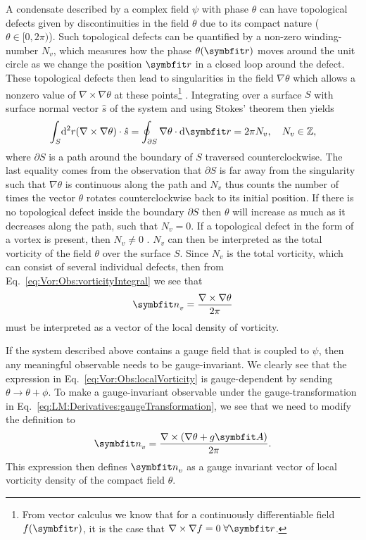 A condensate described by a complex field $\psi$ with phase $\theta$ can have topological defects given by discontinuities in the field $\theta$ due to its compact
nature ($\theta\in[0,2\pi)$). Such topological defects can be quantified by a non-zero winding-number $N_v$, which measures how the phase $\theta(\v{r})$ moves around the
unit circle as we change the position $\v{r}$ in a closed loop around the defect. These topological
defects then lead to singularities in the field $\nabla\theta$ which allows a nonzero value of $\nabla\times\nabla\theta$ at these points\footnote{From vector calculus
we know that for a continuously differentiable field $f(\v{r})$, it is the case that $\nabla\times\nabla f = 0\;\forall\v{r}$.}%
. Integrating over a surface
$S$ with surface normal vector $\hat{s}$ of the system and using Stokes' theorem then yields
\begin{equation}
    \label{eq:Vor:Obs:vorticityIntegral}
    \int_S\!\mathrm{d}^2r (\nabla\times\nabla\theta)\cdot\hat{s} = \oint_{\partial S}\nabla\theta\cdot\mathrm{d}\v{r} = 2\pi N_v,\quad N_v\in\mathbb{Z},
\end{equation}
where $\partial S$ is a path around the boundary of $S$ traversed counterclockwise. The last equality comes from the observation that
$\partial S$ is far away from the singularity such that $\nabla\theta$ is continuous along the path and $N_v$ thus counts the number of times the vector $\theta$
rotates counterclockwise back to its initial position. If there is no topological defect inside the boundary $\partial S$ then $\theta$ will increase as much as it
decreases along the path, such that $N_v=0$. If a topological defect in the form of a vortex is present, then $N_v\neq0$ \cite{Smorgrav052}.
$N_v$ can then be interpreted as the total vorticity of the field $\theta$ over the surface $S$.
Since $N_v$ is the total vorticity, which can consist of several individual defects, then from Eq.~\eqref{eq:Vor:Obs:vorticityIntegral} we see that
\begin{equation}
    \label{eq:Vor:Obs:localVorticity}
    \v{n}_v = \frac{\nabla\times\nabla\theta}{2\pi} 
\end{equation}
must be interpreted as a vector of the local density of vorticity.

If the system described above contains a gauge field that is coupled to $\psi$, then any meaningful observable needs to be gauge-invariant.
We clearly see that the expression in Eq.~\eqref{eq:Vor:Obs:localVorticity} is gauge-dependent by sending $\theta\to\theta+\phi$. To make a gauge-invariant observable under
the gauge-transformation in Eq.~\eqref{eq:LM:Derivatives:gaugeTransformation}, we see that we need to modify the definition to
\begin{equation}
    \label{eq:Vor:Obs:localGaugeVorticity}
    \v{n}_v = \frac{\nabla\times(\nabla\theta + g\v{A})}{2\pi}.
\end{equation}
This expression then defines $\v{n}_v$ as a gauge invariant vector of local vorticity density of the compact field $\theta$.

